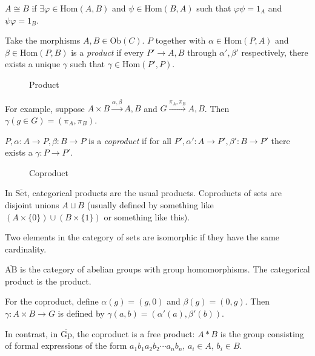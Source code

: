 \documentclass[a4paper,twoside,master.tex]{subfiles}
\begin{document}
$ A \cong B $ if $ \exists \varphi \in \text{Hom}(A,B) $ and $ \psi \in \text{Hom}(B,A) $ such that $ \varphi \psi = 1_A $ and $ \psi \varphi = 1_B $.

\begin{definition}
    Take the morphisms $ A,B \in \text{Ob}(C) $. $ P $ together with $ \alpha \in \text{Hom}(P,A) $ and $ \beta \in \text{Hom}(P,B) $ is a \textit{product} if every $ P' \to A,B $ through $ \alpha', \beta' $ respectively, there exists a unique $ \gamma $ such that $ \gamma \in \text{Hom}(P',P) $.
\end{definition}

\begin{figure}[ht]
    \centering
    \caption{Product}\label{fig:product}
\end{figure}

For example, suppose $ A \times B \xrightarrow{\alpha, \beta} A,B $ and $ G \xrightarrow{\pi_A, \pi_B} A,B $. Then $ \gamma(g \in G) = (\pi_A, \pi_B) $.

\begin{definition}
    $ P, \alpha\colon A \to P, \beta\colon B \to P $ is a \textit{coproduct} if for all $ P', \alpha'\colon A \to P', \beta'\colon B \to P' $ there exists a $ \gamma\colon P \to P' $.
\end{definition}

\begin{figure}[ht]
    \centering
    \caption{Coproduct}\label{fig:coproduct}
\end{figure}

In $ \overline{\text{Set}} $, categorical products are the usual products. Coproducts of sets are disjoint unions $ A\sqcup B $ (usually defined by something like $ (A \times \{0\}) \cup (B \times \{1\}) $ or something like this).

Two elements in the category of sets are isomorphic if they have the same cardinality.

$ \overline{\text{AB}} $ is the category of abelian groups with group homomorphisms. The categorical product is the product.

For the coproduct, define $ \alpha(g) = (g,0) $ and $ \beta(g) = (0,g) $. Then $ \gamma \colon A \times B \to G $ is defined by $ \gamma(a,b) = (\alpha'(a), \beta'(b)) $.

In contrast, in $ \overline{\text{Gp}} $, the coproduct is a free product: $ A \ast B $ is the group consisting of formal expressions of the form $ a_1 b_1 a_2 b_2 \cdots a_n b_n $, $ a_i \in A $, $ b_i \in B $. 
\end{document}
